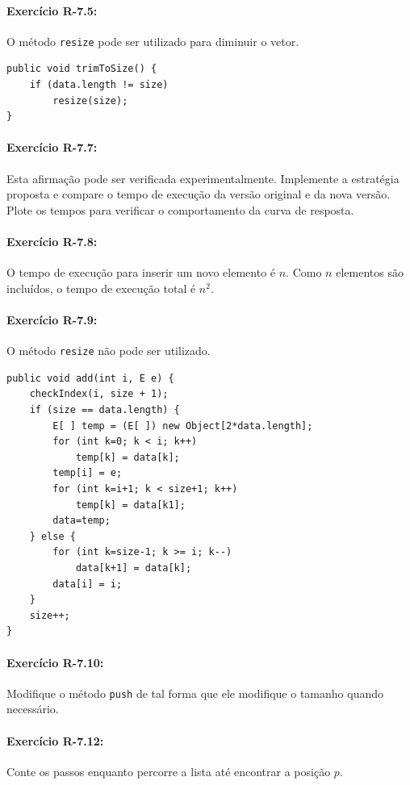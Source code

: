 \paragraph{Exercício R-7.5:}
O método \texttt{resize} pode ser utilizado para diminuir o vetor.

\begin{lstlisting}[frame=single]
public void trimToSize() {
	if (data.length != size)
		resize(size);
}
\end{lstlisting}

\paragraph{Exercício R-7.7:}
Esta afirmação pode ser verificada experimentalmente. Implemente a estratégia proposta e compare o tempo de execução da versão original e da nova versão. Plote os tempos para verificar o comportamento da curva de resposta.

\paragraph{Exercício R-7.8:}
O tempo de execução para inserir um novo elemento é $n$. Como $n$ elementos são incluídos, o tempo de execução total é $n^2$.

\paragraph{Exercício R-7.9:}
O método \texttt{resize} não pode ser utilizado.

\begin{lstlisting}[frame=single]
public void add(int i, E e) {
	checkIndex(i, size + 1);
	if (size == data.length) {
		E[ ] temp = (E[ ]) new Object[2*data.length];
		for (int k=0; k < i; k++)
			temp[k] = data[k];
		temp[i] = e;
		for (int k=i+1; k < size+1; k++)
			temp[k] = data[k1];
		data=temp;
	} else {
		for (int k=size-1; k >= i; k--)
			data[k+1] = data[k];
		data[i] = i;
	}
	size++;
}
\end{lstlisting}

\paragraph{Exercício R-7.10:}
Modifique o método \texttt{push} de tal forma que ele modifique o tamanho quando necessário.

\paragraph{Exercício R-7.12:}
Conte os passos enquanto percorre a lista até encontrar a posição $p$.

